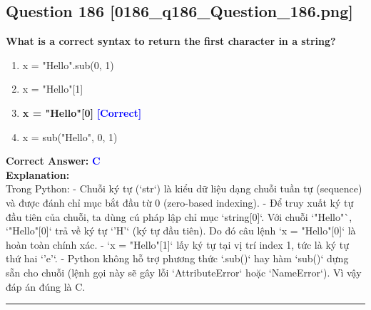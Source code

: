 \documentclass[11pt,a4paper]{article}
\begin{document}
\begin{minipage}{\textwidth}
\subsection*{Question 186 \quad \footnotesize{[0186_q186_Question_186.png]}}
\noindent \textbf{What is a correct syntax to return the first character in a string?}

\begin{enumerate}[label=\Alph*.]
    \item x = "Hello".sub(0, 1)
    \item x = "Hello"[1]
    \item \textbf{x = "Hello"[0]} \hfill \textcolor{blue}{\textbf{[Correct]}}
    \item x = sub("Hello", 0, 1)
\end{enumerate}

\noindent \textbf{Correct Answer:} \textcolor{blue}{\textbf{C}} \\[4pt]
\noindent \textbf{Explanation:}\\
Trong Python:\newline
- Chuỗi ký tự (`str`) là kiểu dữ liệu dạng chuỗi tuần tự (sequence) và được đánh chỉ mục bắt đầu từ 0 (zero-based indexing).\newline
- Để truy xuất ký tự đầu tiên của chuỗi, ta dùng cú pháp lập chỉ mục `string[0]`. Với chuỗi `"Hello"`, `"Hello"[0]` trả về ký tự `'H'` (ký tự đầu tiên). Do đó câu lệnh `x = "Hello"[0]` là hoàn toàn chính xác.\newline
- `x = "Hello"[1]` lấy ký tự tại vị trí index 1, tức là ký tự thứ hai `'e'`.\newline
- Python không hỗ trợ phương thức `.sub()` hay hàm `sub()` dựng sẵn cho chuỗi (lệnh gọi này sẽ gây lỗi `AttributeError` hoặc `NameError`).\newline
Vì vậy đáp án đúng là C.
\end{minipage}
\vspace{0.8cm}
\hrule
\vspace{0.5cm}
\end{document}
